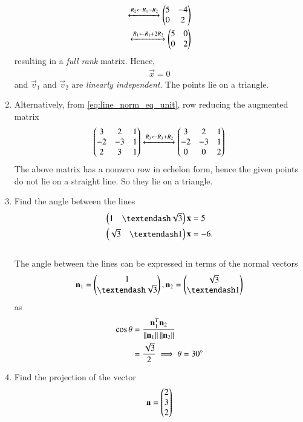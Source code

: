 \begin{enumerate}[label=\thesection.\arabic*.,ref=\thesection.\theenumi]
\begin{align}
\xleftrightarrow[]{R_2\leftarrow R_1-R_2}
\begin{pmatrix}5 & -4\\ 0 & 2\end{pmatrix}
\\
\xleftrightarrow[]{R_1\leftarrow R_1+2R_2}
\begin{pmatrix}5 & 0\\ 0 & 2\end{pmatrix}
\end{align}
resulting in a {\em full rank} matrix.  Hence, 
\begin{align}
 \vec{x} = 0
 \end{align}
and $\vec{v}_1$ and $\vec{v}_2$ are {\em linearly independent}.  The points lie on a triangle.
\item Alternatively, from \eqref{eq:line_norm_eq_unit}, row reducing the augmented matrix
\begin{align}
\begin{pmatrix}3&2 & 1\\ -2&-3 & 1\\ 2&3 & 1\end{pmatrix} \xleftrightarrow[]{R_3\leftarrow R_3+R_2}
\begin{pmatrix}3&2 & 1\\ -2&-3 & 1\\ 0&0 & 2\end{pmatrix}
\end{align}
The above matrix has a nonzero row in echelon form, hence the given points
do not lie on a straight line.  So they lie on a triangle.
\item  Find the angle between the lines 
%
\begin{align}
\begin{split}
\myvec{1 & – \sqrt{3}}\vec{x}  &= 5
\\
\myvec{\sqrt{3} & –1}\vec{x}  &= -6. 
\end{split}
\label{eq:inner_prod_prob}
\end{align}
\\
\solution
The angle between the lines can be expressed in terms of the normal vectors 
\begin{align}
\vec{n}_1 = \myvec{1 \\ – \sqrt{3}},  
\vec{n}_2 =\myvec{\sqrt{3} \\ –1}
\end{align}
as
%
\begin{align}
\label{eq:vec_angle}
\cos \theta &= \frac{\mathbf{n}_1^T\mathbf{n}_2}{\left\lVert\mathbf{n}_1\right\rVert\left\lVert\mathbf{n}_2\right\rVert}
\\
&= \frac{\sqrt{3}}{2} \implies \theta = 30\degree
\end{align}
\item Find the projection of the vector 
\begin{align}
\label{eq:proj_a}
\vec{a} = \myvec{2\\3\\2}

\end{align}
\end{enumerate}

